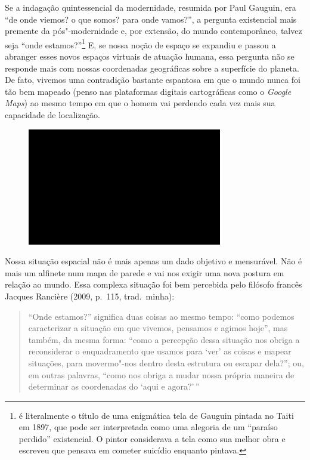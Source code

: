 Se a indagação quintessencial da modernidade, resumida por Paul Gauguin, era
``de onde viemos? o que somos? para onde vamos?'', a pergunta
existencial mais premente da pós"-modernidade e, por extensão, do mundo
contemporâneo, talvez seja ``onde estamos?''\footnote{{} é literalmente o título de uma
  enigmática tela de Gauguin pintada no Taiti em 1897, que pode ser
  interpretada como uma alegoria de um ``paraíso perdido'' existencial.
  O pintor considerava a tela como sua melhor obra e escreveu que
  pensava em cometer suicídio enquanto pintava.} E, se nossa noção de
espaço se expandiu e passou a abranger esses novos espaços virtuais de
atuação humana, essa pergunta não se responde mais com nossas
coordenadas geográficas sobre a superfície do planeta. De fato, vivemos
uma contradição bastante espantosa em que o mundo nunca foi tão bem
mapeado (penso nas plataformas digitais cartográficas como o
\emph{Google Maps}) ao mesmo tempo em que o homem vai perdendo cada vez
mais sua capacidade de localização.

\begin{figure}[!ht]

\centering
 \includegraphics[width=85mm]{./imgs/im1.jpg}
\caption{\tiny{}}

\end{figure}

Nossa situação espacial não é mais apenas um dado objetivo e mensurável.
Não é mais um alfinete num mapa de parede e vai nos exigir uma nova
postura em relação ao mundo. Essa complexa situação foi bem percebida
pelo filósofo francês Jacques Rancière (2009, p.~115, trad.~minha):

\begin{quote}
``Onde estamos?'' significa duas coisas ao mesmo tempo: ``como podemos
caracterizar a situação em que vivemos, pensamos e agimos hoje'', mas
também, da mesma forma: ``como a percepção dessa situação nos obriga a
reconsiderar o enquadramento que usamos para `ver' as coisas e mapear
situações, para movermo"-nos dentro desta estrutura ou escapar dela?'';
ou, em outras palavras, ``como nos obriga a mudar nossa própria maneira
de determinar as coordenadas do `aqui e agora?'\,''
\end{quote}

